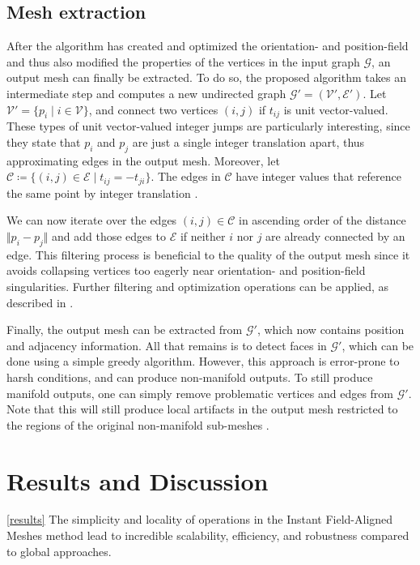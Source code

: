 \documentclass{ACGSeminar}
\begin{document}
\subsection{Mesh extraction}
After the algorithm has created and optimized the orientation- and position-field and thus also modified the properties of the vertices in the input graph $\mathcal{G}$, an output mesh can finally be extracted. To do so, the proposed algorithm takes an intermediate step and computes a new undirected graph $\mathcal{G}' = (\mathcal{V}', \mathcal{E}')$. Let $\mathcal{V}' = \{p_i \mid i \in \mathcal{V}\}$, and connect two vertices $(i,j)$ if $t_{ij}$ is unit vector-valued. These types of unit vector-valued integer jumps are particularly interesting, since they state that $p_i$ and $p_j$ are just a single integer translation apart, thus approximating edges in the output mesh. Moreover, let $\mathcal{C} \coloneqq \{(i,j) \in \mathcal{E} \mid t_{ij} = -t_{ji}\}$. The edges in $\mathcal{C}$ have integer values that reference the same point by integer translation \cite{jakob2015instant}.

We can now iterate over the edges $(i,j) \in \mathcal{C}$ in ascending order of the distance $\Vert p_i - p_j \Vert$ and add those edges to $\mathcal{E}$ if neither $i$ nor $j$ are already connected by an edge. This filtering process is beneficial to the quality of the output mesh since it avoids collapsing vertices too eagerly near orientation- and position-field singularities. Further filtering and optimization operations can be applied, as described in \cite{jakob2015instant}.\bigskip

Finally, the output mesh can be extracted from $\mathcal{G}'$, which now contains position and adjacency information. All that remains is to detect faces in $\mathcal{G}'$, which can be done using a simple greedy algorithm. However, this approach is error-prone to harsh conditions, and can produce non-manifold outputs. To still produce manifold outputs, one can simply remove problematic vertices and edges from $\mathcal{G}'$. Note that this will still produce local artifacts in the output mesh restricted to the regions of the original non-manifold sub-meshes \cite{jakob2015instant}.

\section{Results and Discussion}\ref{results}
The simplicity and locality of operations in the Instant Field-Aligned Meshes method lead to incredible scalability, efficiency, and robustness compared to global approaches.
\end{document}
